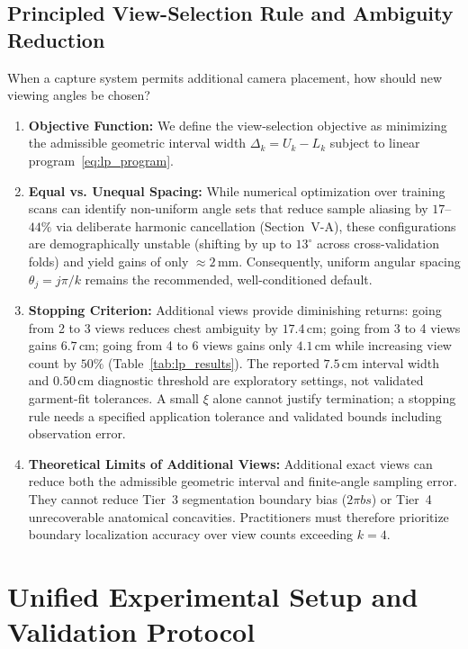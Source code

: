 \documentclass[journal]{IEEEtran}
\begin{document}
\subsection{Principled View-Selection Rule and Ambiguity Reduction}
When a capture system permits additional camera placement, how should new viewing angles be chosen?
\begin{enumerate}
    \item \textbf{Objective Function:} We define the view-selection objective as minimizing the admissible geometric interval width $\Delta_k = U_k - L_k$ subject to linear program~\eqref{eq:lp_program}.
    \item \textbf{Equal vs. Unequal Spacing:} While numerical optimization over training scans can identify non-uniform angle sets that reduce sample aliasing by $17$--$44\%$ via deliberate harmonic cancellation (Section~V-A), these configurations are demographically unstable (shifting by up to $13^\circ$ across cross-validation folds) and yield gains of only $\approx 2$\,mm. Consequently, uniform angular spacing $\theta_j = j\pi/k$ remains the recommended, well-conditioned default.
    \item \textbf{Stopping Criterion:} Additional views provide diminishing returns: going from 2 to 3 views reduces chest ambiguity by $17.4$\,cm; going from 3 to 4 views gains $6.7$\,cm; going from 4 to 6 views gains only $4.1$\,cm while increasing view count by $50\%$ (Table~\ref{tab:lp_results}). The reported $7.5$\,cm interval width and $0.50$\,cm diagnostic threshold are exploratory settings, not validated garment-fit tolerances. A small $\xi$ alone cannot justify termination; a stopping rule needs a specified application tolerance and validated bounds including observation error.
    \item \textbf{Theoretical Limits of Additional Views:} Additional exact views can reduce both the admissible geometric interval and finite-angle sampling error. They cannot reduce Tier~3 segmentation boundary bias ($2\pi b s$) or Tier~4 unrecoverable anatomical concavities. Practitioners must therefore prioritize boundary localization accuracy over view counts exceeding $k=4$.
\end{enumerate}

\section{Unified Experimental Setup and Validation Protocol}
\label{sec:experimental_setup}
\end{document}
